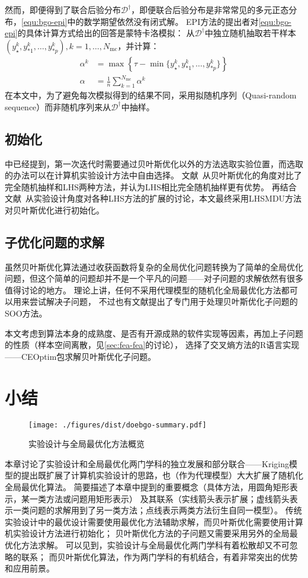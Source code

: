 \documentclass[index]{subfiles}
\begin{document}
然而，即便得到了联合后验分布$\mathcal{D}^\dag$，即便联合后验分布是非常常见的多元正态分布，\cref{equ:bgo-epi}中的数学期望依然没有闭式解。
EPI方法的提出者对\cref{equ:bgo-epi}的具体计算方式给出的回答是蒙特卡洛模拟\cite{clark2012}：
从$\mathcal{D}^\dag$中独立随机抽取若干样本$\left(y_\star^k, y_{\ast 1}^k,\ldots,y_{\ast p}^k\right), k=1,\ldots,N_\mathrm{mc}$，并计算：
\begin{align}\label{equ:bgo-mc}
  \alpha^k &= \max\!\left\{\tau - \min\{y_\star^k, y_{\ast 1}^k,\ldots,y_{\ast p}^k\}\right\} \\
  \alpha &= \frac{1}{n}\sum_{k=1}^{N_\mathrm{mc}}\alpha^k
\end{align}
在本文中，为了避免每次模拟得到的结果不同，采用拟随机序列（Quasi-random sequence）而非随机序列来从$\mathcal{D}^\dag$中抽样。

\subsection{初始化}\label{ssec:bgo-init}
中已经提到，第一次迭代时需要通过贝叶斯优化以外的方法选取实验位置，而选取的办法可以在计算机实验设计方法中自由选择。
文献~从贝叶斯优化的角度对比了完全随机抽样和LHS两种方法，并认为LHS相比完全随机抽样更有优势。
再结合文献~从实验设计角度对各种LHS方法的扩展的讨论，本文最终采用LHSMDU方法对贝叶斯优化进行初始化。

\subsection{子优化问题的求解}\label{ssec:bgo-sub}
虽然贝叶斯优化算法通过收获函数将复杂的全局优化问题转换为了简单的全局优化问题，但这个简单的问题却并不是一个平凡的问题——对子问题的求解依然有很多值得讨论的地方。
理论上讲，任何不采用代理模型的随机化全局最优化方法都可以用来尝试解决子问题，
不过也有文献提出了专门用于处理贝叶斯优化子问题的SOO方法\cite{munos2011}。

本文考虑到算法本身的成熟度、是否有开源成熟的软件实现等因素，再加上子问题的性质（样本空间离散，见\cref{sec:fea-fea}的讨论），
选择了交叉熵方法的R语言实现——CEOptim包\cite{benham2015}求解贝叶斯优化子问题。

\section{小结}
\begin{figure}[h]
  \centering
  \texttt{[image: ./figures/dist/doebgo-summary.pdf]}
  \caption{实验设计与全局最优化方法概览\label{fig:doebgo-summary}}
\end{figure}
本章讨论了实验设计和全局最优化两门学科的独立发展和部分联合——Kriging模型的提出既扩展了计算机实验设计的思路，也（作为代理模型）大大扩展了随机化全局最优化算法。
简要描述了本章中提到的重要概念（具体方法，用圆角矩形表示，某一类方法或问题用矩形表示）
及其联系（实线箭头表示扩展；虚线箭头表示一类问题的求解用到了另一类方法；点线表示两类方法衍生自同一模型）。
传统实验设计中的最优设计需要使用最优化方法辅助求解，而贝叶斯优化需要使用计算机实验设计方法进行初始化；
贝叶斯优化方法的子问题又需要采用另外的全局最优化方法求解。
可以见到，实验设计与全局最优化两门学科有着松散却又不可忽略的联系；
而贝叶斯优化算法，作为两门学科的有机结合，有着非常突出的优势和应用前景。
\end{document}
